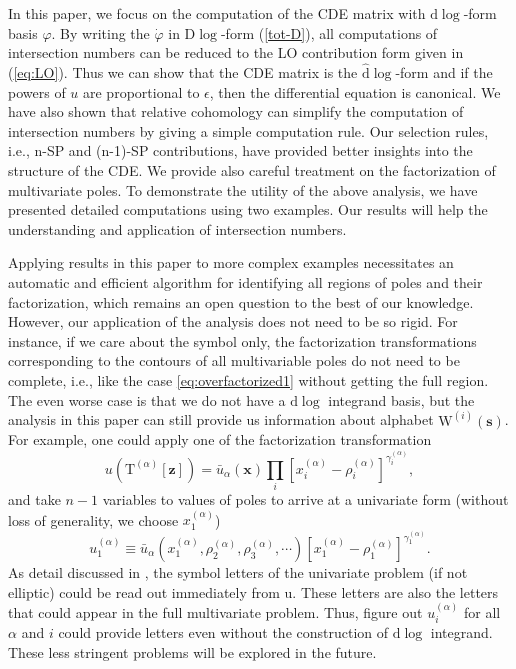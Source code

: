 \documentclass[a4paper,11pt]{article}
\newcommand{\nd}{\mathrm{d}}
\newcommand{\nD}{\mathrm{D}}
\newcommand{\nT}{\mathrm{T}}
\newcommand{\nds}{\hat{\mathrm{d}}}
\newcommand{\ep}{\epsilon}
\def\eref#1{(\ref{#1})}
\begin{document}
In this paper, we focus on the computation of the CDE matrix with $\nd \log$-form basis ${\varphi}$. By writing the $\dot{\varphi}$ in $\nD \log$-form \eref{tot-D}, all computations of intersection numbers can be reduced to
the  LO contribution form given in \eref{eq:LO}. Thus we can show that the CDE matrix is the $\nds \log$-form
and if the powers of $u$ are proportional to $\ep$, then the differential equation is canonical. We have also shown
that  relative cohomology can simplify the computation of intersection numbers by giving a simple computation rule. Our selection rules, i.e., n-SP and (n-1)-SP contributions, have provided better insights into the structure of the CDE. We  provide also careful treatment on the factorization of multivariate poles. 
To demonstrate the utility of the above analysis, we have presented detailed computations using two examples.  
Our results will help the understanding and application of intersection numbers.





Applying results in this paper to more complex examples necessitates an automatic and efficient algorithm for identifying all regions of poles and their factorization, which remains an open question to the best of our knowledge. However, our application of the analysis does not need to be so rigid. 
For instance, if we care about the symbol only, the factorization transformations corresponding to the contours of all multivariable poles do not need to be complete, i.e., like the case \eqref{eq:overfactorized1} without 
getting the full region. The even worse case is that we do not have a $\nd \log$ integrand basis, but the analysis in this paper can still provide us information about alphabet $\text{W}^{(i)}(\bm{s})$. For example, one could apply one of the factorization transformation
\begin{equation}
	u(\nT^{(\alpha)}[\bm{z}]) = \bar{u}_\alpha(\bm{x}) \prod_i \left[ x_i^{(\alpha)} - \rho_i^{(\alpha)} \right]^{\gamma_i^{(\alpha)}} ,
\end{equation}
and take $n-1$ variables to  values of poles to arrive at a univariate form (without loss of generality, we choose $x_1^{(\alpha)}$)
\begin{equation}
	u_1^{(\alpha)} \equiv \bar{u}_\alpha\left(x_1^{(\alpha)},\rho_2^{(\alpha)},\rho_3^{(\alpha)},\cdots  \right)  \left[ x_1^{(\alpha)} - \rho_1^{(\alpha)} \right]^{\gamma_1^{(\alpha)}} .
\end{equation}
As detail discussed in \cite{Chen:2023kgw}, the symbol letters of the univariate problem (if not elliptic) could be read out immediately from u. These letters are also the letters that could appear in the full multivariate problem. Thus, figure out $u_i^{(\alpha)}$ for all $\alpha$ and $i$ could 
provide letters even without the construction of $\nd \log$ integrand. These less stringent problems will be explored in the future.
\end{document}

